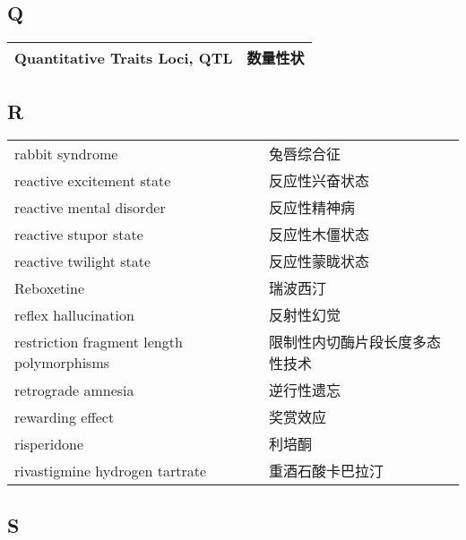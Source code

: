 \subsection*{Q}

\begin{longtable}[]{@{}ll@{}}
\toprule
\endhead
Quantitative Traits Loci, QTL & 数量性状\tabularnewline
\bottomrule
\end{longtable}

\subsection*{R}

\begin{longtable}[]{@{}ll@{}}
\toprule
\endhead
rabbit syndrome & 兔唇综合征\tabularnewline
reactive excitement state & 反应性兴奋状态\tabularnewline
reactive mental disorder & 反应性精神病\tabularnewline
reactive stupor state & 反应性木僵状态\tabularnewline
reactive twilight state & 反应性蒙眬状态\tabularnewline
Reboxetine & 瑞波西汀\tabularnewline
reflex hallucination & 反射性幻觉\tabularnewline
restriction fragment length polymorphisms &
限制性内切酶片段长度多态性技术\tabularnewline
retrograde amnesia & 逆行性遗忘\tabularnewline
rewarding effect & 奖赏效应\tabularnewline
risperidone & 利培酮\tabularnewline
rivastigmine hydrogen tartrate & 重酒石酸卡巴拉汀\tabularnewline
\bottomrule
\end{longtable}

\subsection*{S}

